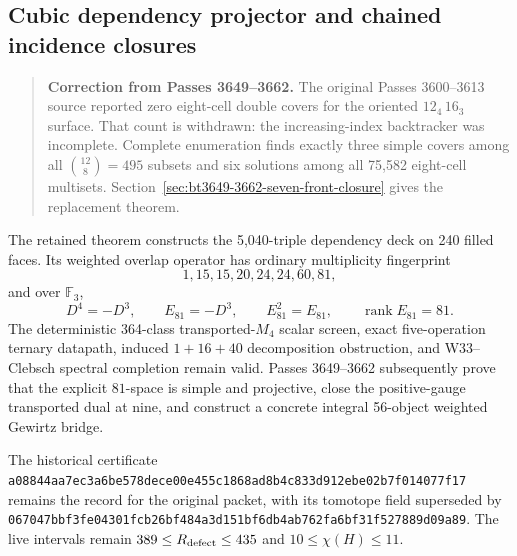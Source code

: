\subsection{Cubic dependency projector and chained incidence closures}
\label{sec:bt3600-3613-chained-breakthrough}

\begin{quote}
\textbf{Correction from Passes 3649--3662.}
The original Passes 3600--3613 source reported zero eight-cell double covers for the oriented \(12_4\,16_3\) surface. That count is withdrawn: the increasing-index backtracker was incomplete. Complete enumeration finds exactly three simple covers among all \(\binom{12}{8}=495\) subsets and six solutions among all 75,582 eight-cell multisets. Section~\ref{sec:bt3649-3662-seven-front-closure} gives the replacement theorem.
\end{quote}

The retained theorem constructs the 5,040-triple dependency deck on 240 filled faces. Its weighted overlap operator has ordinary multiplicity fingerprint
\[
1,15,15,20,24,24,60,81,
\]
and over \(\mathbb F_3\),
\[
D^4=-D^3,\qquad E_{81}=-D^3,\qquad E_{81}^2=E_{81},\qquad \operatorname{rank}E_{81}=81.
\]
The deterministic 364-class transported-\(M_4\) scalar screen, exact five-operation ternary datapath, induced \(1+16+40\) decomposition obstruction, and W33--Clebsch spectral completion remain valid. Passes 3649--3662 subsequently prove that the explicit \(81\)-space is simple and projective, close the positive-gauge transported dual at nine, and construct a concrete integral 56-object weighted Gewirtz bridge.

The historical certificate \texttt{a08844aa7ec3a6be578dece00e455c1868ad8b4c833d912ebe02b7f014077f17} remains the record for the original packet, with its tomotope field superseded by \texttt{067047bbf3fe04301fcb26bf484a3d151bf6db4ab762fa6bf31f527889d09a89}. The live intervals remain \(389\leq R_{\rm defect}\leq435\) and \(10\leq\chi(H)\leq11\).
